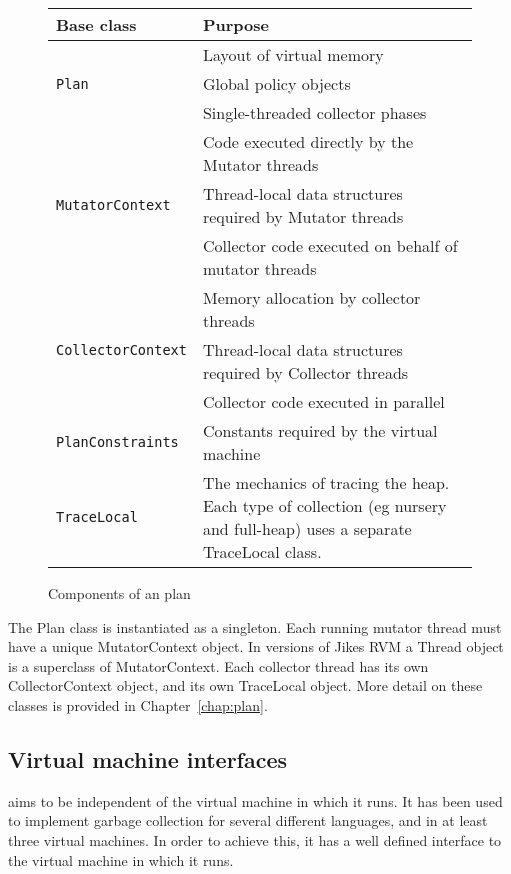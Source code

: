 \begin{figure}
\begin{tabular}{|l|p{9cm}|}
\hline
Base class & Purpose \\
\hline
\multirow{3}{*}{\lstinline|Plan|} & Layout of virtual memory  \\
& Global policy objects \\
& Single-threaded collector phases \\ \hline
\multirow{3}{*}{\lstinline|MutatorContext|}  & Code executed directly by the Mutator threads \\
& Thread-local data structures required by Mutator threads \\
& Collector code executed on behalf of mutator threads \\ \hline
\multirow{3}{*}{\lstinline|CollectorContext|} & Memory allocation by collector threads \\
& Thread-local data structures required by Collector threads \\ 
& Collector code executed in parallel \\ \hline
\lstinline|PlanConstraints|  & Constants required by the virtual machine \\ \hline
\lstinline|TraceLocal| & The mechanics of tracing the heap.  Each type of collection
(eg nursery and full-heap) uses a separate TraceLocal class.  \\ \hline
\end{tabular}
\caption{Components of an \mmtk plan}
\label{fig:intro:plan}
\end{figure}

The Plan class is instantiated as a singleton.  Each running mutator thread must
have a unique MutatorContext object. In versions of Jikes RVM a Thread object is
a superclass of MutatorContext.  Each collector thread has its own CollectorContext object, and its own TraceLocal object.  More detail on these classes is provided in Chapter~\ref{chap:plan}.
%
% 

\subsection{Virtual machine interfaces}

\mmtk aims to be independent of the virtual machine in which it runs.  It has
been used to implement garbage collection for several different languages,
and in at least three \java virtual machines.  In order to achieve this, it has
a well defined interface to the virtual machine in which it runs.  

